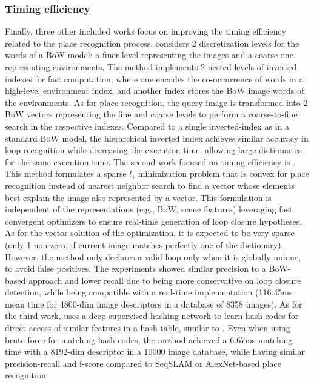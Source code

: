 \subsubsection{Timing efficiency}

Finally, three other included works focus on improving the timing efficiency related to the place recognition process.
\cite{mohan-et-al:2015:7139966} considers 2 discretization levels for the words of a BoW model: a finer level representing the images and a coarse one representing environments. The method implements 2 nested levels of inverted indexes for fast computation, where one encodes the co-occurrence of words in a high-level environment index, and another index stores the BoW image words of the environments. As for place recognition, the query image is transformed into 2 BoW vectors representing the fine and coarse levels to perform a coarse-to-fine search in the respective indexes. Compared to a single inverted-index as in a standard BoW model, the hierarchical inverted index achieves similar accuracy in loop recognition while decreasing the execution time, allowing large dictionaries for the same execution time.
The second work focused on timing efficiency is \cite{latif-et-al:2017:016}. This method formulates a sparse $l_1$ minimization problem that is convex  for place recognition instead of nearest neighbor search to find a vector whose elements best explain the image also represented by a vector. This formulation is independent of the representations (e.g., BoW, scene features) leveraging fast convergent optimizers to ensure real-time generation of loop closure hypotheses. As for the vector solution of the optimization, it is expected to be very sparse (only 1 non-zero, if current image matches perfectly one of the dictionary). However, the method only declares a valid loop only when it is globally unique, to avoid false positives. The experiments showed similar precision to a BoW-based approach and lower recall due to being more conservative on loop closure detection, while being compatible with a real-time implementation (116.45ms mean time for 4800-dim image descriptors in a database of 8358 images).
As for the third work, \cite{wu-wu:2019:8968599} uses a deep supervised hashing network to learn hash codes for direct access of similar features in a hash table, similar to \cite{ikeda-tanaka:2010:5509579}. Even when using brute force for matching hash codes, the method achieved a 6.67ms matching time with a 8192-dim descriptor in a 10000 image database, while having similar precision-recall and f-score compared to SeqSLAM or AlexNet-based place recognition.





